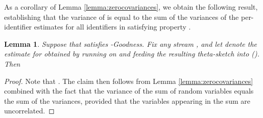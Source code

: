 \documentclass{article}
\newtheorem{lemma}[theorem]{Lemma}
\begin{document}
As a corollary of Lemma \ref{lemma:zerocovariances}, we obtain the following result, establishing that the variance 
of  is equal to the sum of the variances of the per-identifier estimates for all identifiers in  satisfying property .

\begin{lemma} \label{the_corollary} Suppose that  satisfies -Goodness. Fix any stream , and let 
denote the estimate for  obtained by running  on  and feeding the resulting theta-sketch into ().
Then

\end{lemma}
\begin{proof}
Note that . The claim then follows from Lemma \ref{lemma:zerocovariances} combined with the fact
that the variance of the sum of random variables equals the sum of the variances, provided that the variables appearing in the sum are uncorrelated. 


\end{proof}
\end{document}
